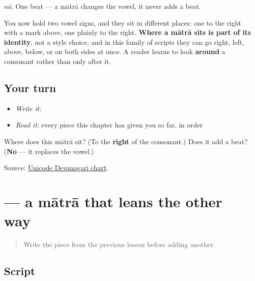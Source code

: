 \emph{nā}. One beat — a mātrā changes the vowel, it never adds a beat.

You now hold two vowel signs, and they sit in different places: one to the right with a mark above, one plainly to the right. \textbf{Where a mātrā sits is part of its identity}, not a style choice, and in this family of scripts they can go right, left, above, below, or on both sides at once. A reader learns to look \textbf{around} a consonant rather than only after it.

\subsection*{Your turn}
\begin{itemize}
\raggedright
  \item \emph{Write it:} 
  \item \emph{Read it:} every piece this chapter has given you so far, in order
\end{itemize}

\begin{tcolorbox}[breakable,colback=teal!4,colframe=teal!35!black,title={Before you move on}]
Where does this mātrā sit? (To the \textbf{right} of the consonant.) Does it add a beat? (\textbf{No} — it replaces the vowel.)

Source: \href{https://www.unicode.org/charts/PDF/U0900.pdf}{Unicode Devanagari chart}.
\end{tcolorbox}
\section[\texorpdfstring{\mr{ी} (-ī)}{ी (-ī)}]{ — a mātrā that leans the other way}

\label{lesson:MR-W01-ii-matra}



\begin{quote}
Write the piece from the previous lesson before adding another.
\end{quote}

\subsection*{Script}

\begin{quote}
\end{quote}

